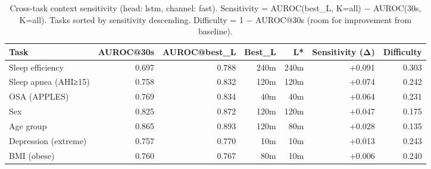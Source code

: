 \begin{table}[ht]
\centering
\caption{Cross-task context sensitivity (head: lstm, channel: fast). Sensitivity = AUROC(best\_L, K=all) − AUROC(30s, K=all). Tasks sorted by sensitivity descending. Difficulty = 1 − AUROC@30s (room for improvement from baseline).}
\label{tab:sensitivity_fast_lstm}
\begin{tabular}{lrrrrrr}
\toprule
Task & AUROC@30s & AUROC@best_L & Best_L & L* & Sensitivity (Δ) & Difficulty \\
\midrule
Sleep efficiency & 0.697 & 0.788 & 240m & 240m & +0.091 & 0.303 \\
Sleep apnea (AHI≥15) & 0.758 & 0.832 & 120m & 120m & +0.074 & 0.242 \\
OSA (APPLES) & 0.769 & 0.834 & 40m & 40m & +0.064 & 0.231 \\
Sex & 0.825 & 0.872 & 120m & 120m & +0.047 & 0.175 \\
Age group & 0.865 & 0.893 & 120m & 80m & +0.028 & 0.135 \\
Depression (extreme) & 0.757 & 0.770 & 10m & 10m & +0.013 & 0.243 \\
BMI (obese) & 0.760 & 0.767 & 80m & 10m & +0.006 & 0.240 \\
\bottomrule
\end{tabular}
\end{table}